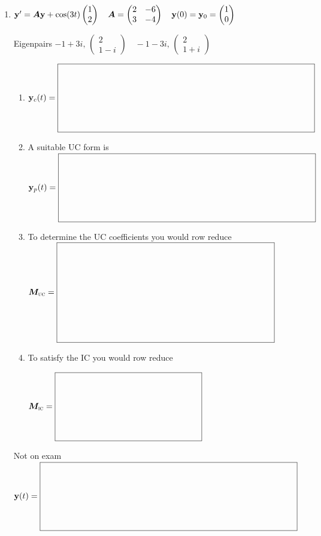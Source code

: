 \documentclass[12pt,letterpaper]{article}
\newcommand{\mat}[1]{\bm{#1}}
\newcommand{\SystemBlank}[2]{%
  \vcenter{\hbox{$\boxed{\rule{0pt}{#2}\makebox[#1]{}}$}}}
\newcommand{\VectorBlank}{\SystemBlank{4.16in}{1.04in}}
\newcommand{\MatrixBlank}{\SystemBlank{2.34in}{1.04in}}
\begin{document}
\begin{enumerate}
\newpage
\item
\begingroup\setlength{\arraycolsep}{3pt}
$\vect{y}'=\mat{A}\vect{y}+\cos(3t)\begin{pmatrix}1\\2\end{pmatrix}\quad \mat{A}=\begin{pmatrix}2&-6\\3&-4\end{pmatrix}\quad \vect{y}(0)=\vect{y}_0=\begin{pmatrix}1\\0\end{pmatrix}$
\par Eigenpairs $-1+3i,\,\begin{pmatrix}2\\1-i\end{pmatrix}\quad -1-3i,\,\begin{pmatrix}2\\1+i\end{pmatrix}$
\endgroup
\begin{enumerate}
\item 
$\vect{y}_c(t)=\VectorBlank$
\item A suitable UC form is
\newline
$\vect{y}_p(t)=\VectorBlank$
\item To determine the UC coefficients 
you would row reduce \newline
$\mat{M}_{\text{\textsc{uc}}}=\SystemBlank{3.51in}{1.56in}$
\item To satisfy the IC you would row reduce
\par\noindent $\mat{M}_{\text{\textsc{ic}}}=\MatrixBlank$\par
\end{enumerate}
\vfill
Not on exam  $\vect{y}(t)=\VectorBlank$

\end{enumerate}
\end{document}
